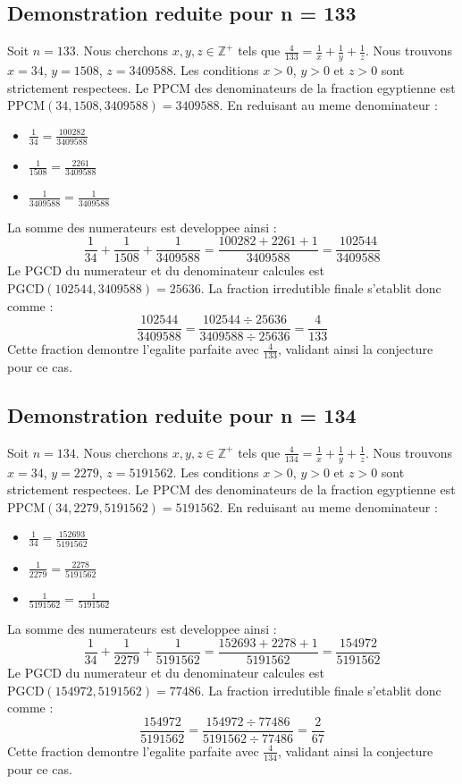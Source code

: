 \documentclass[11pt,a4paper]{article}
\begin{document}
\subsection{Demonstration reduite pour n = 133}
Soit $n = 133$. Nous cherchons $x, y, z \in \mathbb{Z}^{+}$ tels que $\frac{4}{133} = \frac{1}{x} + \frac{1}{y} + \frac{1}{z}$.
Nous trouvons $x = 34$, $y = 1508$, $z = 3409588$.
Les conditions $x > 0$, $y > 0$ et $z > 0$ sont strictement respectees.
Le PPCM des denominateurs de la fraction egyptienne est $\text{PPCM}(34, 1508, 3409588) = 3409588$.
En reduisant au meme denominateur :
\begin{itemize}
    \item $\frac{1}{34} = \frac{100282}{3409588}$
    \item $\frac{1}{1508} = \frac{2261}{3409588}$
    \item $\frac{1}{3409588} = \frac{1}{3409588}$
\end{itemize}
La somme des numerateurs est developpee ainsi :
$$ \frac{1}{34} + \frac{1}{1508} + \frac{1}{3409588} = \frac{100282 + 2261 + 1}{3409588} = \frac{102544}{3409588} $$
Le PGCD du numerateur et du denominateur calcules est $\text{PGCD}(102544, 3409588) = 25636$.
La fraction irredutible finale s'etablit donc comme :
$$ \frac{102544}{3409588} = \frac{102544 \div 25636}{3409588 \div 25636} = \frac{4}{133} $$
Cette fraction demontre l'egalite parfaite avec $\frac{4}{133}$, validant ainsi la conjecture pour ce cas.

\subsection{Demonstration reduite pour n = 134}
Soit $n = 134$. Nous cherchons $x, y, z \in \mathbb{Z}^{+}$ tels que $\frac{4}{134} = \frac{1}{x} + \frac{1}{y} + \frac{1}{z}$.
Nous trouvons $x = 34$, $y = 2279$, $z = 5191562$.
Les conditions $x > 0$, $y > 0$ et $z > 0$ sont strictement respectees.
Le PPCM des denominateurs de la fraction egyptienne est $\text{PPCM}(34, 2279, 5191562) = 5191562$.
En reduisant au meme denominateur :
\begin{itemize}
    \item $\frac{1}{34} = \frac{152693}{5191562}$
    \item $\frac{1}{2279} = \frac{2278}{5191562}$
    \item $\frac{1}{5191562} = \frac{1}{5191562}$
\end{itemize}
La somme des numerateurs est developpee ainsi :
$$ \frac{1}{34} + \frac{1}{2279} + \frac{1}{5191562} = \frac{152693 + 2278 + 1}{5191562} = \frac{154972}{5191562} $$
Le PGCD du numerateur et du denominateur calcules est $\text{PGCD}(154972, 5191562) = 77486$.
La fraction irredutible finale s'etablit donc comme :
$$ \frac{154972}{5191562} = \frac{154972 \div 77486}{5191562 \div 77486} = \frac{2}{67} $$
Cette fraction demontre l'egalite parfaite avec $\frac{4}{134}$, validant ainsi la conjecture pour ce cas.
\end{document}
